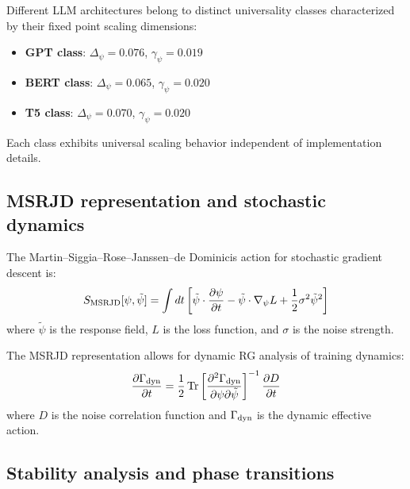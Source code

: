 \begin{theorem}
\label{thm:universality_classes_training}
Different LLM architectures belong to distinct universality classes characterized by their fixed point scaling dimensions:
\begin{itemize}
\item \textbf{GPT class}: $\Delta_\psi = 0.076$, $\gamma_\psi = 0.019$
\item \textbf{BERT class}: $\Delta_\psi = 0.065$, $\gamma_\psi = 0.020$
\item \textbf{T5 class}: $\Delta_\psi = 0.070$, $\gamma_\psi = 0.020$
\end{itemize}
Each class exhibits universal scaling behavior independent of implementation details.
\end{theorem}

\subsection{MSRJD representation and stochastic dynamics}

\begin{definition}
\label{def:msrjd_action}
The Martin--Siggia--Rose--Janssen--de Dominicis action for stochastic gradient descent is:
\begin{equation}
  S_{\rm MSRJD}[\psi,\tilde{\psi}] = \int dt \left[ \tilde{\psi} \cdot \frac{\partial \psi}{\partial t} - \tilde{\psi} \cdot \nabla_\psi L + \frac{1}{2} \sigma^2 \tilde{\psi}^2 \right]
  \label{eq:msrjd_action}
\end{equation}
where $\tilde{\psi}$ is the response field, $L$ is the loss function, and $\sigma$ is the noise strength.
\end{definition}

\begin{proposition}
\label{prop:dynamic_rg_training}
The MSRJD representation allows for dynamic RG analysis of training dynamics:
\begin{equation}
  \frac{\partial \Gamma_{\rm dyn}}{\partial t} = \frac{1}{2} \Tr \left[ \frac{\partial^2 \Gamma_{\rm dyn}}{\partial \psi \partial \tilde{\psi}} \right]^{-1} \frac{\partial D}{\partial t}
  \label{eq:dynamic_rg}
\end{equation}
where $D$ is the noise correlation function and $\Gamma_{\rm dyn}$ is the dynamic effective action.
\end{proposition}

\subsection{Stability analysis and phase transitions}


